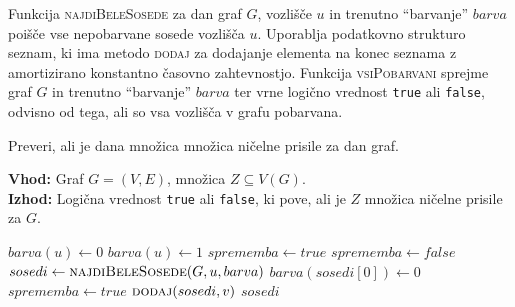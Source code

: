 \documentclass[12pt,a4paper,twoside]{article}
\theoremstyle{definition} %
\theoremstyle{plain} %
\numberwithin{equation}{section}  %
\begin{document}
Funkcija \textsc{najdiBeleSosede} za dan graf $G$, vozlišče $u$ in trenutno ``barvanje'' $barva$ poišče vse nepobarvane sosede vozlišča $u$. Uporablja podatkovno strukturo seznam, ki ima metodo \textsc{dodaj} za dodajanje elementa na konec seznama z amortizirano konstantno časovno zahtevnostjo. Funkcija \textsc{vsiPobarvani} sprejme graf $G$ in trenutno ``barvanje'' $barva$  ter vrne logično vrednost \texttt{true} ali \texttt{false}, odvisno od tega, ali so vsa vozlišča v grafu pobarvana.
\begin{algorithm}[!h]
    \caption{Preveri, ali je dana množica množica ničelne prisile za dan graf.}
    \label{alg:preveri-zf-naiven}
    \raggedright
    \textbf{Vhod:} Graf $G = (V,E)$, množica $Z \subseteq V(G)$. \\
    \textbf{Izhod:} Logična vrednost \texttt{true} ali \texttt{false}, ki pove, ali je $Z$ množica ničelne prisile za $G$.
    \begin{algorithmic}[1]
        \State $barva(u) \gets 0$ 
        \EndFor
        \State $barva(u) \gets 1$ 
        \EndFor
        \State $sprememba \gets true$
        \State $sprememba \gets false$
        \State $sosedi \gets \Call{najdiBeleSosede}{G, u, barva}$
         
        \State $barva(sosedi[0]) \gets 0$ 
        \State $sprememba \gets true$
        \EndIf
        \EndIf
        \EndFor
        \EndWhile
        \State \Return {}
        \EndFunction
        \vspace{2mm}
         
        \State $\Call{dodaj}{sosedi, v}$
        \EndIf
        \EndFor
        \State \Return $sosedi$
        \EndFunction
        \vspace{1mm}
         
        \EndIf
        \EndFor
        \State {} 
        \EndFunction
    \end{algorithmic}
\end{algorithm}
\end{document}
